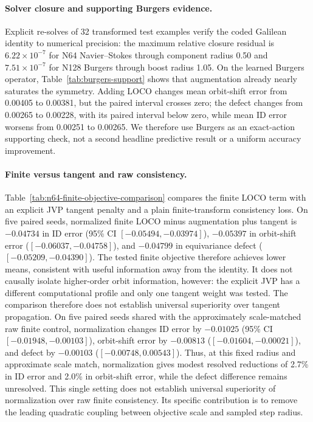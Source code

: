\paragraph{Solver closure and supporting Burgers evidence.}
Explicit re-solves of 32 transformed test examples verify the coded Galilean
identity to numerical precision: the maximum relative closure residual is
\(6.22\times10^{-7}\) for N64 Navier--Stokes through component radius 0.50 and
\(7.51\times10^{-7}\) for N128 Burgers through boost radius 1.05.  On the learned
Burgers operator, Table~\ref{tab:burgers-support} shows that augmentation already
nearly saturates the symmetry.  Adding LOCO changes mean orbit-shift error from
0.00405 to 0.00381, but the paired interval crosses zero; the defect changes from
0.00265 to 0.00228, with its paired interval below zero, while mean ID error
worsens from 0.00251 to 0.00265.  We therefore use Burgers as an exact-action
supporting check, not a second headline predictive result or a uniform accuracy
improvement.

\paragraph{Finite versus tangent and raw consistency.}
Table~\ref{tab:n64-finite-objective-comparison} compares the finite LOCO term with
an explicit JVP tangent penalty and a plain finite-transform consistency loss.  On
five paired seeds, normalized finite LOCO minus augmentation plus tangent is
\(-0.04734\) in ID error (95\% CI \([-0.05494,-0.03974]\)), \(-0.05397\) in
orbit-shift error (\([-0.06037,-0.04758]\)), and \(-0.04799\) in equivariance
defect (\([-0.05209,-0.04390]\)).  The tested finite objective therefore achieves
lower means, consistent with useful information away from the identity.  It does
not causally isolate higher-order orbit information, however: the explicit JVP has
a different computational profile and only one tangent weight was tested.  The
comparison therefore does not establish universal superiority over tangent
propagation.  On five paired seeds shared with the approximately scale-matched
raw finite control, normalization changes ID error by \(-0.01025\) (95\% CI
\([-0.01948,-0.00103]\)), orbit-shift error by \(-0.00813\)
(\([-0.01604,-0.00021]\)), and defect by \(-0.00103\)
(\([-0.00748,0.00543]\)).  Thus, at this fixed radius and approximate scale
match, normalization gives modest resolved reductions of 2.7\% in ID error and
2.0\% in orbit-shift error, while the defect difference remains unresolved.
This single setting does not establish universal superiority of normalization
over raw finite consistency.  Its specific contribution is to remove the leading
quadratic coupling between objective scale and sampled step radius.

